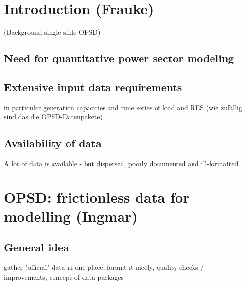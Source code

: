 \documentclass[article]{elsarticle}
\begin{document}
\section{Introduction (Frauke)}
(Background single slide OPSD)

\subsection{Need for quantitative power sector modeling}

\subsection{Extensive input data requirements}
in particular generation capacities and time series of load and RES (wie zufällig sind das die OPSD-Datenpakete) 

\subsection{Availability of data}
A lot of data is available - but dispersed, poorly documented and ill-formatted 

    
\section{OPSD: frictionless data for modelling (Ingmar)}
\subsection{General idea}
gather "official" data in one place, foramt it nicely, quality checks / improvements; concept of data packages 
\end{document}
